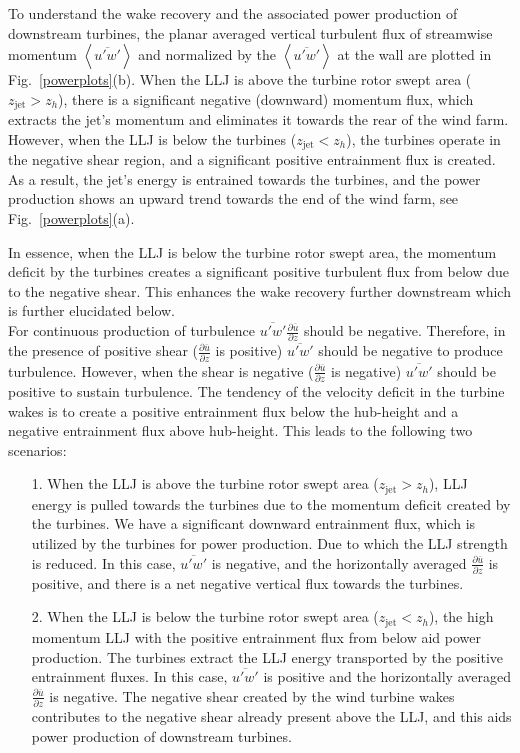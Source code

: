 \documentclass[%
 aip,
 amsmath,amssymb,
reprint,
twocolumn,%
author-numerical,%
]{revtex4-1}
\begin{document}
{\indent To understand the wake recovery and the associated power production of downstream turbines, the planar averaged vertical turbulent flux of streamwise momentum $\left<\overline{u'w'}\right>$ and normalized by the $\left<\overline{u'w'}\right>$ at the wall are plotted in Fig.\ \ref{powerplots}(b). When the LLJ is above the turbine rotor swept area ($z_\text{jet} > z_h$), there is a significant negative (downward) momentum flux, which extracts the jet's momentum and eliminates it towards the rear of the wind farm. However, when the LLJ is below the turbines ($z_\text{jet} < z_h $), the turbines operate in the negative shear region, and a significant positive entrainment flux is created. As a result, the jet's energy is entrained towards the turbines, and the power production shows an upward trend towards the end of the wind farm, see Fig.\ \ref{powerplots}(a). {{\color{black} In essence, when the LLJ is below the turbine rotor swept area, the momentum deficit by the turbines creates a significant positive turbulent flux from below due to the negative shear.} This enhances the wake recovery further downstream which is further elucidated below.\\
\indent For continuous production of turbulence $\overline{u'w'}\frac{\partial{\overline{u}}}{\partial{z}}$ should be negative. Therefore, in the presence of positive shear ($\frac{\partial{\overline{u}}}{\partial{z}}$ is positive) $\overline{u'w'}$ should be negative to produce turbulence. However, when the shear is negative ($\frac{\partial{\overline{u}}}{\partial{z}}$ is negative) $\overline{u'w'}$ should be positive to sustain turbulence. The tendency of the velocity deficit in the turbine wakes is to create a positive entrainment flux below the hub-height and a negative entrainment flux above hub-height. This leads to the following two scenarios: 
\begin{itemize}
 \item[1.] When the LLJ is above the turbine rotor swept area ($z_\text{jet} > z_h$), LLJ energy is pulled towards the turbines due to the momentum deficit created by the turbines. We have a significant downward entrainment flux, which is utilized by the turbines for power production. Due to which the LLJ strength is reduced. 
 In this case, $\overline{u'w'}$ is negative, and the horizontally averaged $\frac{\partial{\overline{u}}}{\partial{z}}$ is positive, and there is a net negative vertical flux towards the turbines.
 \item[2.] When the LLJ is below the turbine rotor swept area ($z_\text{jet} < z_h$), the high momentum LLJ with the positive entrainment flux from below aid power production. The turbines extract the LLJ energy transported by the positive entrainment fluxes. 
 In this case, $\overline{u'w'}$ is positive and the horizontally averaged $\frac{\partial{\overline{u}}}{\partial{z}}$ is negative. The negative shear created by the wind turbine wakes contributes to the negative shear already present above the LLJ, and this aids power production of downstream turbines.
\end{itemize}

}}
\end{document}
